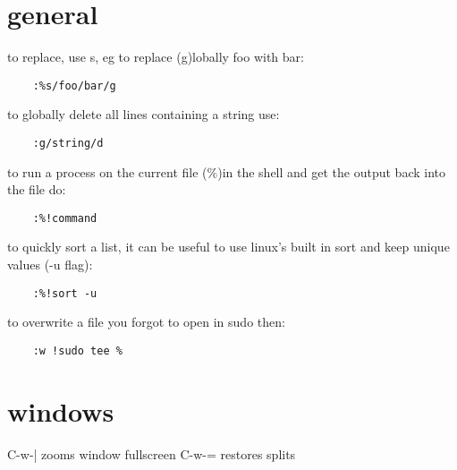 \section{general}%
\label{sec:general}

to replace, use s, eg to replace (g)lobally foo with bar:
\begin{verbatim}
	:%s/foo/bar/g
\end{verbatim}

to globally delete all lines containing a string use:
\begin{verbatim}
	:g/string/d
\end{verbatim}

to run a process on the current file (\%)in the shell and get the output back into the file do:
\begin{verbatim}
	:%!command
\end{verbatim}

to quickly sort a list, it can be useful to use linux's built in sort and keep unique values (-u flag):
\begin{verbatim}
	:%!sort -u
\end{verbatim}

to overwrite a file you forgot to open in sudo then:
\begin{verbatim}
	:w !sudo tee %
\end{verbatim}
\section*{windows}%
\label{sec:windows}

C-w-| zooms window fullscreen
C-w-= restores splits

